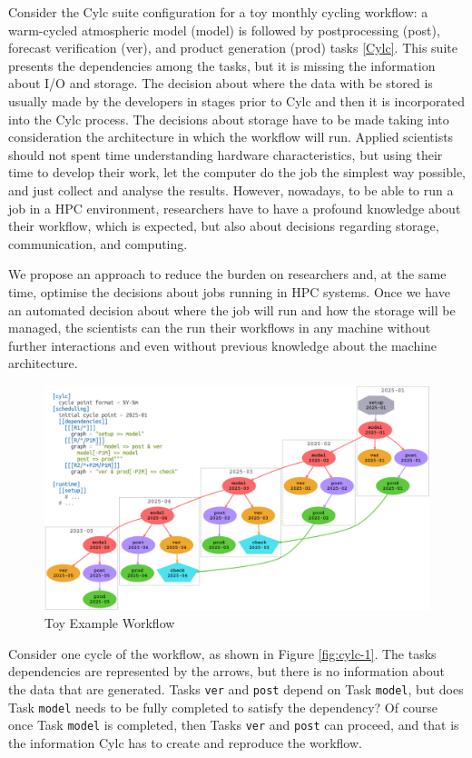 \documentclass[a4paper]{article}
\begin{document}
Consider the Cylc suite configuration for a toy monthly cycling workflow: a warm-cycled atmospheric model (model) is followed by postprocessing (post), forecast verification (ver), and product generation (prod) tasks \ref{Cylc}. This suite presents the dependencies among the tasks, but it is missing the information about I/O and storage. The decision about where the data with be stored is usually made by the developers in stages prior to Cylc and then it is incorporated into the Cylc process. The decisions about storage have to be made taking into consideration the architecture in which the workflow will run. Applied scientists should not spent time understanding hardware characteristics, but using their time to develop their work, let the computer do the job the simplest way possible, and just collect and analyse the results. However, nowadays, to be able to run a job in a HPC environment, researchers have to have a profound knowledge about their workflow, which is expected, but also about decisions regarding storage, communication, and computing.

We propose an approach to reduce the burden on researchers and, at the same time, optimise the decisions about jobs running in HPC systems. Once we have an automated decision about where the job will run and how the storage will be managed, the scientists can the run their workflows in any machine without further interactions and even without previous knowledge about the machine architecture.

\begin{figure}[H]
  \centering
  \includegraphics[width=0.9\columnwidth]{cylc}
  \caption{Toy Example Workflow}
  \label{fig:cylc}
\end{figure}

Consider one cycle of the workflow, as shown in Figure \ref{fig:cylc-1}. The tasks dependencies are represented by the arrows, but there is no information about the data that are generated. Tasks \texttt{ver} and \texttt{post} depend on Task \texttt{model}, but does Task \texttt{model} needs to be fully completed to satisfy the dependency? Of course once Task \texttt{model} is completed, then Tasks \texttt{ver} and \texttt{post} can proceed, and that is the information Cylc has to create and reproduce the workflow.
\end{document}
